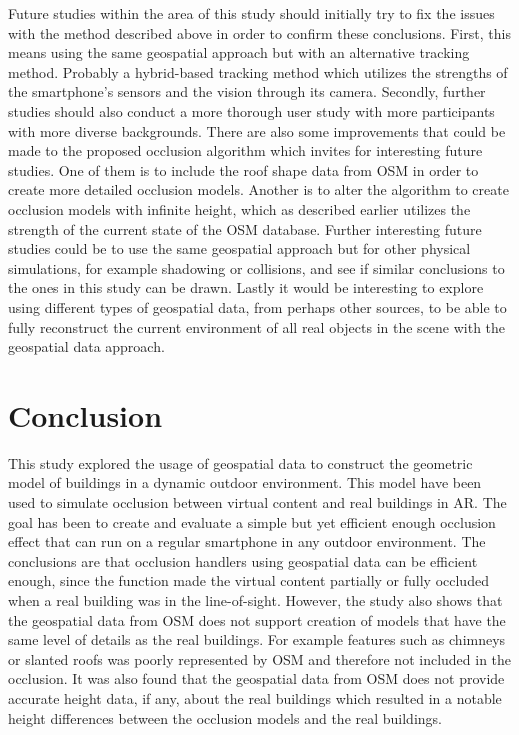 Future studies within the area of this study should initially try to fix the issues with the method described above in order to confirm these conclusions. First, this means using the same geospatial approach but with an alternative tracking method. Probably a hybrid-based tracking method which utilizes the strengths of the smartphone's sensors and the vision through its camera. Secondly, further studies should also conduct a more thorough user study with more participants with more diverse backgrounds. There are also some improvements that could be made to the proposed occlusion algorithm which invites for interesting future studies. One of them is to include the roof shape data from OSM in order to create more detailed occlusion models. Another is to alter the algorithm to create occlusion models with infinite height, which as described earlier utilizes the strength of the current state of the OSM database. Further interesting future studies could be to use the same geospatial approach but for other physical simulations, for example shadowing or collisions, and see if similar conclusions to the ones in this study can be drawn. Lastly it would be interesting to explore using different types of geospatial data, from perhaps other sources, to be able to fully reconstruct the current environment of all real objects in the scene with the geospatial data approach. 

\section{Conclusion}
This study explored the usage of geospatial data to construct the geometric model of buildings in a dynamic outdoor environment. This model have been used to simulate occlusion between virtual content and real buildings in AR. The goal has been to create and evaluate a simple but yet efficient enough occlusion effect that can run on a regular smartphone in any outdoor environment. The conclusions are that occlusion handlers using geospatial data can be efficient enough, since the function made the virtual content partially or fully occluded when a real building was in the line-of-sight. However, the study also shows that the geospatial data from OSM does not support creation of models that have the same level of details as the real buildings. For example features such as chimneys or slanted roofs was poorly represented by OSM and therefore not included in the occlusion. It was also found that the geospatial data from OSM does not provide accurate height data, if any, about the real buildings which resulted in a notable height differences between the occlusion models and the real buildings. 

